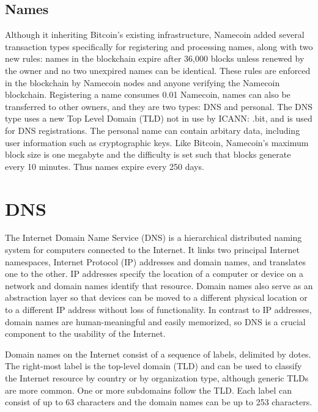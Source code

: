 \subsection{Names}

Although it inheriting Bitcoin's existing infrastructure, Namecoin added several transaction types specifically for registering and processing names, along with two new rules: names in the blockchain expire after 36,000 blocks unless renewed by the owner and no two unexpired names can be identical. These rules are enforced in the blockchain by Namecoin nodes and anyone verifying the Namecoin blockchain. Registering a name consumes 0.01 Namecoin, names can also be transferred to other owners, and they are two types: DNS and personal. The DNS type uses a new Top Level Domain (TLD) not in use by ICANN: .bit, and is used for DNS registrations. The personal name can contain arbitary data, including user information such as cryptographic keys. Like Bitcoin, Namecoin's maximum block size is one megabyte and the difficulty is set such that blocks generate every 10 minutes. Thus names expire every 250 days. 





\section{DNS}

The Internet Domain Name Service (DNS) is a hierarchical distributed naming system for computers connected to the Internet. It links two principal Internet namespaces, Internet  Protocol (IP) addresses and domain names, and translates one to the other. IP addresses specify the location of a computer or device on a network and domain names identify that resource. Domain names also serve as an abstraction layer so that devices can be moved to a different physical location or to a different IP address without loss of functionality. In contrast to IP addresses, domain names are human-meaningful and easily memorized, so DNS is a crucial component to the usability of the Internet.

Domain names on the Internet consist of a sequence of labels, delimited by dotes. The right-most label is the top-level domain (TLD) and can be used to classify the Internet resource by country or by organization type, although generic TLDs are more common. One or more subdomains follow the TLD. Each label can consist of up to 63 characters and the domain names can be up to 253 characters.  





